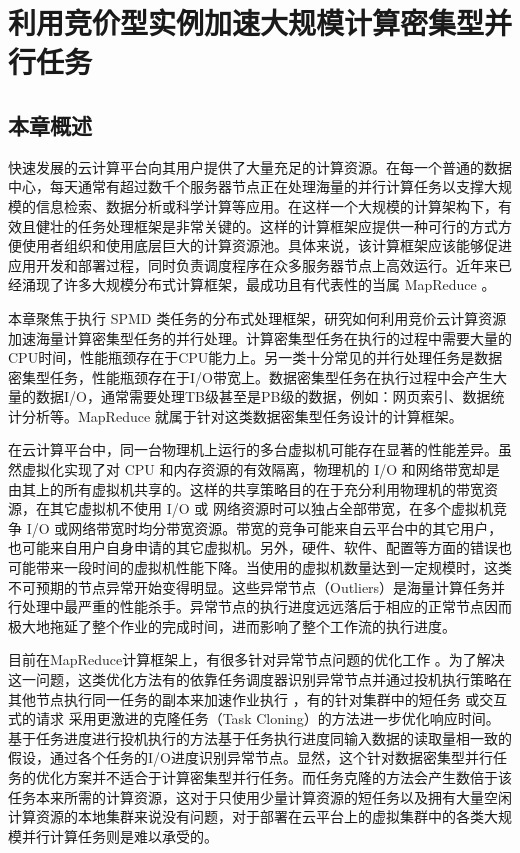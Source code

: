 \chapter{利用竞价型实例加速大规模计算密集型并行任务}
\label{cha:no2}

\section{本章概述}
\label{sec:no2_intro}
快速发展的云计算平台向其用户提供了大量充足的计算资源。在每一个普通的数据中心，每天通常有超过数千个服务器节点正在处理海量的并行计算任务以支撑大规模的信息检索、数据分析或科学计算等应用。在这样一个大规模的计算架构下，有效且健壮的任务处理框架是非常关键的。这样的计算框架应提供一种可行的方式方便使用者组织和使用底层巨大的计算资源池。具体来说，该计算框架应该能够促进应用开发和部署过程，同时负责调度程序在众多服务器节点上高效运行。近年来已经涌现了许多大规模分布式计算框架，最成功且有代表性的当属 MapReduce \cite{Dean:2004:MSD:1251254.1251264}。

本章聚焦于执行 SPMD 类任务的分布式处理框架，研究如何利用竞价云计算资源加速海量计算密集型任务的并行处理。计算密集型任务在执行的过程中需要大量的CPU时间，性能瓶颈存在于CPU能力上。另一类十分常见的并行处理任务是数据密集型任务，性能瓶颈存在于I/O带宽上。数据密集型任务在执行过程中会产生大量的数据I/O，通常需要处理TB级甚至是PB级的数据，例如：网页索引、数据统计分析等。MapReduce 就属于针对这类数据密集型任务设计的计算框架。

在云计算平台中，同一台物理机上运行的多台虚拟机可能存在显著的性能差异。虽然虚拟化实现了对 CPU 和内存资源的有效隔离，物理机的 I/O 和网络带宽却是由其上的所有虚拟机共享的。这样的共享策略目的在于充分利用物理机的带宽资源，在其它虚拟机不使用 I/O 或 网络资源时可以独占全部带宽，在多个虚拟机竞争 I/O 或网络带宽时均分带宽资源。带宽的竞争可能来自云平台中的其它用户，也可能来自用户自身申请的其它虚拟机。另外，硬件、软件、配置等方面的错误也可能带来一段时间的虚拟机性能下降。当使用的虚拟机数量达到一定规模时，这类不可预期的节点异常开始变得明显。这些异常节点（Outliers）是海量计算任务并行处理中最严重的性能杀手。异常节点的执行进度远远落后于相应的正常节点因而极大地拖延了整个作业的完成时间，进而影响了整个工作流的执行进度。

目前在MapReduce计算框架上，有很多针对异常节点问题的优化工作 \cite{Zaharia:2008:IMP:1855741.1855744, Ananthanarayanan:2010:ROM:1924943.1924962, 180304, Dean:2013:TS:2408776.2408794}。为了解决这一问题，这类优化方法有的依靠任务调度器识别异常节点并通过投机执行策略在其他节点执行同一任务的副本来加速作业执行 \cite{Zaharia:2008:IMP:1855741.1855744, Ananthanarayanan:2010:ROM:1924943.1924962}，有的针对集群中的短任务 \cite{180304} 或交互式的请求 \cite{Dean:2013:TS:2408776.2408794} 采用更激进的克隆任务（Task Cloning）的方法进一步优化响应时间。基于任务进度进行投机执行的方法基于任务执行进度同输入数据的读取量相一致的假设，通过各个任务的I/O进度识别异常节点。显然，这个针对数据密集型并行任务的优化方案并不适合于计算密集型并行任务。而任务克隆的方法会产生数倍于该任务本来所需的计算资源，这对于只使用少量计算资源的短任务以及拥有大量空闲计算资源的本地集群来说没有问题，对于部署在云平台上的虚拟集群中的各类大规模并行计算任务则是难以承受的。

